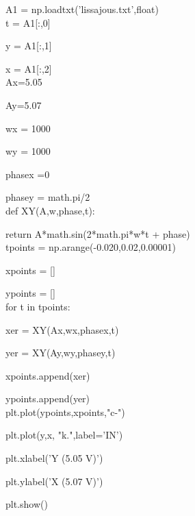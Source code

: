 \documentclass[twoside]{article}
\begin{document}
A1 = np.loadtxt('lissajous.txt',float)\\

t = A1[:,0]

y = A1[:,1]

x = A1[:,2]\\


Ax=5.05

Ay=5.07

wx = 1000

wy = 1000

phasex =0

phasey = math.pi/2\\


def XY(A,w,phase,t):

\hspace{1cm} return A*math.sin(2*math.pi*w*t + phase)\\

tpoints = np.arange(-0.020,0.02,0.00001)

xpoints = []

ypoints = []\\

for t in tpoints:

\hspace{1cm} xer = XY(Ax,wx,phasex,t)
    
\hspace{1cm} yer = XY(Ay,wy,phasey,t)
    
\hspace{1cm} xpoints.append(xer)
    
\hspace{1cm} ypoints.append(yer)\\
    
plt.plot(ypoints,xpoints,"c-")

plt.plot(y,x, "k.",label='IN')

plt.xlabel('Y (5.05 V)')

plt.ylabel('X (5.07 V)')

plt.show()
\end{document}

